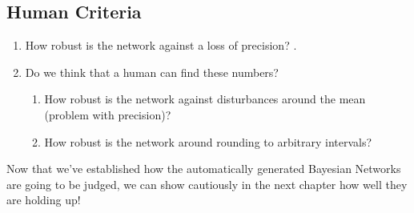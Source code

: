 \subsection{Human Criteria}
\begin{enumerate}

\item How robust is the network against a loss of precision? \citep{Druzdzel2013}.

\item Do we think that a human can find these numbers?
	\begin{enumerate}
	\item How robust is the network against disturbances around the mean (problem with precision)?
	\item How robust is the network around rounding to arbitrary intervals?
	\end{enumerate}
\end{enumerate}

Now that we've established how the automatically generated Bayesian Networks are going to be judged, we can show cautiously in the next chapter how well they are holding up!


